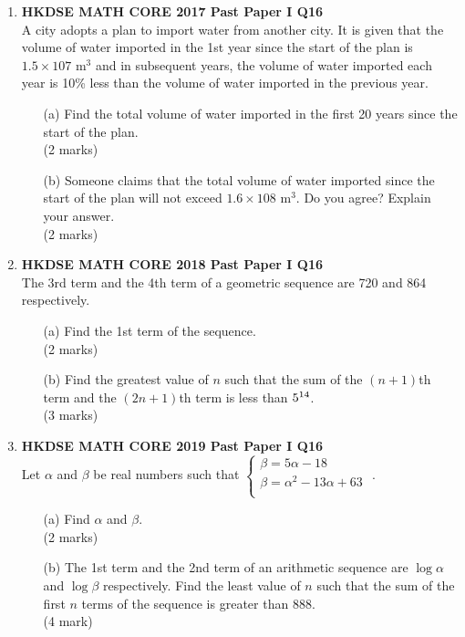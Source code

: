 \documentclass[12pt]{article}
\begin{document}
\begin{enumerate}
	\item \textbf{HKDSE MATH CORE 2017 Past Paper I Q16}\\
	A city adopts a plan to import water from another city. It is given that the volume of water imported in the 1st year since the start of the plan is $1.5 \times 107$ m$^3$ and in subsequent years, the volume of water imported each year is 10\% less than the volume of water imported in the previous year.
	\begin{enumerate}
		\item[(a)] Find the total volume of water imported in the first 20 years since the start of the plan. \\(2 marks) 
		\item[(b)] Someone claims that the total volume of water imported since the start of the plan will not exceed $1.6 \times 108$ m$^3$. Do you agree? Explain your answer. \\(2 marks)
	\end{enumerate}

    \item \textbf{HKDSE MATH CORE 2018 Past Paper I Q16}\\
	The 3rd term and the 4th term of a geometric sequence are 720 and 864 respectively.
	\begin{enumerate}
		\item[(a)] Find the 1st term of the sequence. \\(2 marks)
		\item[(b)] Find the greatest value of $n$ such that the sum of the $(n + 1)$th term and the $(2n + 1)$th term is less than $5 \time 10^{14}$. \\(3 marks)
	\end{enumerate}

    \item \textbf{HKDSE MATH CORE 2019 Past Paper I Q16}\\
	Let $\alpha$ and $\beta$ be real numbers such that $\left\{\begin{matrix}
		\beta  =  5\alpha  -  18 \\
		\beta = \alpha^2 - 13\alpha + 63\\
		\end{matrix}\right.$ .
	\begin{enumerate}
		\item[(a)] Find $\alpha$ and $\beta$. \\(2 marks)
		\item[(b)] The 1st term and the 2nd term of an arithmetic sequence are $\log{\alpha}$ and $\log{\beta}$ respectively. Find the least value of $n$ such that the sum of the first $n$ terms of the sequence is greater than 888. \\(4 mark)
	\end{enumerate}


\end{enumerate}
\end{document}
